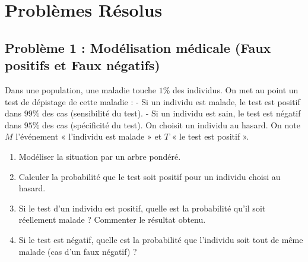 \section{Problèmes Résolus}

\subsection*{Problème 1 : Modélisation médicale (Faux positifs et Faux négatifs)}
Dans une population, une maladie touche $1\%$ des individus. On met au point un test de dépistage de cette maladie :
- Si un individu est malade, le test est positif dans $99\%$ des cas (sensibilité du test).
- Si un individu est sain, le test est négatif dans $95\%$ des cas (spécificité du test).
On choisit un individu au hasard. On note $M$ l'événement « l'individu est malade » et $T$ « le test est positif ».
\begin{enumerate}
    \item Modéliser la situation par un arbre pondéré.
    \item Calculer la probabilité que le test soit positif pour un individu choisi au hasard.
    \item Si le test d'un individu est positif, quelle est la probabilité qu'il soit réellement malade ? Commenter le résultat obtenu.
    \item Si le test est négatif, quelle est la probabilité que l'individu soit tout de même malade (cas d'un faux négatif) ?
\end{enumerate}

